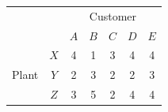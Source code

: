 \begin{center}
    \begin{tabular}{c|*{6}{c|}}
    \multicolumn{2}{c}{} & \multicolumn{5}{c}{Customer} \\ \cline{2-7}
    & & $A$ & $B$ & $C$ & $D$ & $E$ \\ \cline{2-7}
    \multirow{3}{*}{Plant} & $X$ & 4 & 1 & 3 & 4 & 4 \\ \cline{2-7}
    & $Y$ & 2 & 3 & 2 & 2 & 3 \\ \cline{2-7}
    & $Z$ & 3 & 5 & 2 & 4 & 4 \\ \cline{2-7} 
    \end{tabular}
\end{center}